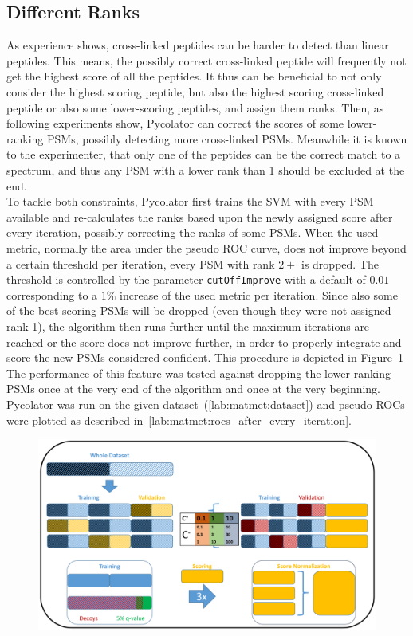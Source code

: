 \subsection{Different Ranks}
\label{lab:matmet:ranks}
As experience shows, cross-linked peptides can be harder to detect than linear peptides. This means, the possibly correct cross-linked peptide will frequently not get the highest score of all the peptides. It thus can be beneficial to not only consider the highest scoring peptide, but also the highest scoring cross-linked peptide or also some lower-scoring peptides, and assign them ranks. Then, as following experiments show, Pycolator can correct the scores of some lower-ranking PSMs, possibly detecting more cross-linked PSMs. Meanwhile it is known to the experimenter, that only one of the peptides can be the correct match to a spectrum, and thus any PSM with a lower rank than 1 should be excluded at the end.\\
To tackle both constraints, Pycolator first trains the SVM with every PSM available and re-calculates the ranks based upon the newly assigned score after every iteration, possibly correcting the ranks of some PSMs. When the used metric, normally the area under the pseudo ROC curve, does not improve beyond a certain threshold per iteration, every PSM with rank $2+$ is dropped. The threshold is controlled by the parameter \texttt{cutOffImprove} with a default of $0.01$ corresponding to a $1\%$ increase of the used metric per iteration. Since also some of the best scoring PSMs will be dropped (even though they were not assigned rank 1), the algorithm then runs further until the maximum iterations are reached or the score does not improve further, in order to properly integrate and score the new PSMs considered confident. This procedure is depicted in Figure~\ref{fig:optimalRanking_outline}\\
The performance of this feature was tested against dropping the lower ranking PSMs once at the very end of the algorithm and once at the very beginning. Pycolator was run on the given dataset~(\ref{lab:matmet:dataset}) and pseudo ROCs were plotted as described in~\ref{lab:matmet:rocs_after_every_iteration}.
\renewcommand{\baselinestretch}{0.9}
\begin{figure}
	\normalsize
	\centering
	\includegraphics[width = \textwidth, page=2]{figures/Pycolator_diagram.pdf}
	\caption[Procedure of dealing with ranked PSMs]{}
	\label{fig:optimalRanking_outline}
\end{figure}
\renewcommand{\baselinestretch}{1}\\
